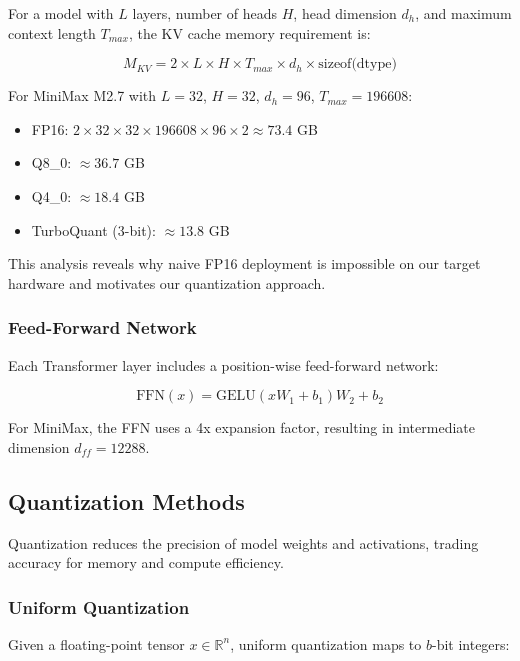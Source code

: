 For a model with $L$ layers, number of heads $H$, head dimension $d_h$, and maximum context length $T_{max}$, the KV cache memory requirement is:

\begin{equation}
M_{KV} = 2 \times L \times H \times T_{max} \times d_h \times \text{sizeof(dtype)}
\end{equation}

For MiniMax M2.7 with $L=32$, $H=32$, $d_h=96$, $T_{max}=196608$:

\begin{itemize}
    \item FP16: $2 \times 32 \times 32 \times 196608 \times 96 \times 2 \approx 73.4$ GB
    \item Q8\_0: $\approx 36.7$ GB
    \item Q4\_0: $\approx 18.4$ GB
    \item TurboQuant (3-bit): $\approx 13.8$ GB
\end{itemize}

This analysis reveals why naive FP16 deployment is impossible on our target hardware and motivates our quantization approach.

\subsubsection{Feed-Forward Network}

Each Transformer layer includes a position-wise feed-forward network:

\begin{equation}
\text{FFN}(x) = \text{GELU}(xW_1 + b_1)W_2 + b_2
\end{equation}

For MiniMax, the FFN uses a 4x expansion factor, resulting in intermediate dimension $d_{ff} = 12288$.

\subsection{Quantization Methods}

Quantization reduces the precision of model weights and activations, trading accuracy for memory and compute efficiency.

\subsubsection{Uniform Quantization}

Given a floating-point tensor $x \in \mathbb{R}^n$, uniform quantization maps to $b$-bit integers:

